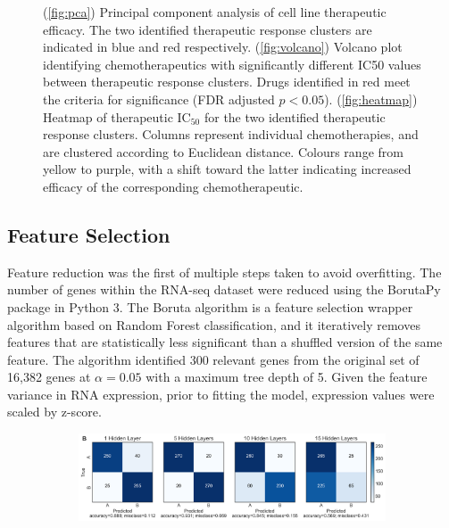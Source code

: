 \documentclass[10pt, letterpaper]{article}
\begin{document}
\begin{multicols}{2}
\begin{figure}[!ht]
    \caption{(\ref{fig:pca}) Principal component analysis of cell line therapeutic efficacy. The two identified therapeutic response clusters are indicated in blue and red respectively. (\ref{fig:volcano}) Volcano plot identifying chemotherapeutics with significantly different IC50 values between therapeutic response clusters. Drugs identified in red meet the criteria for significance (FDR adjusted $p<0.05$). (\ref{fig:heatmap}) Heatmap of therapeutic IC$_{50}$ for the two identified therapeutic response clusters. Columns represent individual chemotherapies, and are clustered according to Euclidean distance. Colours range from yellow to purple, with a shift toward the latter indicating increased efficacy of the corresponding chemotherapeutic.}
    \label{fig:clustering}
\end{figure}


\subsection*{Feature Selection}
Feature reduction was the first of multiple steps taken to avoid overfitting. The number of genes within the RNA-seq dataset were reduced using the BorutaPy package in Python 3. The Boruta algorithm is a feature selection wrapper algorithm based on Random Forest classification, and it iteratively removes features that are statistically less significant than a shuffled version of the same feature. The algorithm identified 300 relevant genes from the original set of 16,382 genes at $\alpha=0.05$ with a maximum tree depth of 5. Given the feature variance in RNA expression, prior to fitting the model, expression values were scaled by z-score.


\begin{figure}[!ht]
    \centering
    \begin{subfigure}[t]{\textwidth}
        \centering
        \includegraphics[width=\textwidth]{Figures/confusion_matrix/cm_combined.png}
        \caption{}
        \label{fig:cms}
    \end{subfigure}


\end{figure}
\end{multicols}
\end{document}
